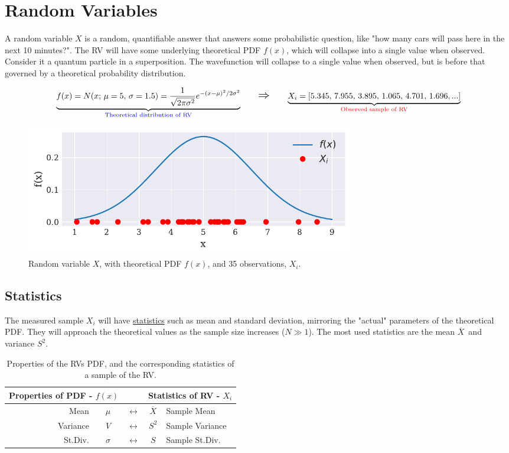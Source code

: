 \documentclass[12p,a4paper]{report}
\renewcommand{\exp}{e^}
\renewcommand{\exp}{e^}
\renewcommand{\bar}{\overline}
\newcommand{\lRightarrow}{\mathlarger{\mathlarger{\Rightarrow}}}
\begin{document}
\chapter{Random Variables}
A random variable $X$ is a random, quantifiable answer that answers some probabilistic question, like "how many cars will pass here in the next 10 minutes?". The RV will have some underlying theoretical PDF $f(x)$, which will collapse into a single value when observed. Consider it a quantum particle in a superposition. The wavefunction will collapse to a single value when observed, but is before that governed by a theoretical probability distribution.


\begin{align*}
    \underbrace{
        f(x) = N(x;\, \mu=5,\, \sigma=1.5) = \frac{1}{\sqrt{2\pi\sigma^2}}\exp{-(x-\mu)^2/2\sigma^2}
    }_{\text{\textcolor{blue}{Theoretical distribution of RV}} }
    \quad\quad \lRightarrow \quad\quad
    \underbrace{
        X_i = [5.345,\, 7.955,\, 3.895,\, 1.065,\, 4.701,\, 1.696,...]
    }_{\text{\textcolor{red}{Observed sample of RV}}}
\end{align*}
\begin{figure}[H]
    \centering
    \includegraphics[width=0.7\textwidth]{figs/RV:1.pdf}
    \caption{Random variable $X$, with theoretical PDF $f(x)$, and 35 observations, $X_i$.}
    \label{fig:1}
\end{figure}


\section*{Statistics}
The measured sample $X_i$ will have \underline{statistics} such as mean and standard deviation, mirroring the "actual" parameters of the theoretical PDF. They will approach the theoretical values as the sample size increases ($N\gg 1$). The most used statistics are the mean $\bar{X}$ and variance $S^2$.

\begin{table}[H]
    \centering
    \begin{tabular}{r  c  c  c  l}\toprule
        \multicolumn{2}{c}{\bf{Properties of PDF - $f(x)$}}  & &  \multicolumn{2}{c}{\bf{Statistics of RV - $X_i$}} \\ \midrule
        Mean  &  $\mu$  & $\leftrightarrow$ &  $\bar{X}$  &  Sample Mean  \\ \midrule
        Variance  &  $V$  & $\leftrightarrow$ &  $S^2$  &  Sample Variance \\ \midrule
        St.Div.  &  $\sigma$  & $\leftrightarrow$ &  $S$  &  Sample St.Div.
    \end{tabular}
    \caption{Properties of the RVs PDF, and the corresponding statistics of a sample of the RV.}
    \label{table:1}
\end{table}
\end{document}
